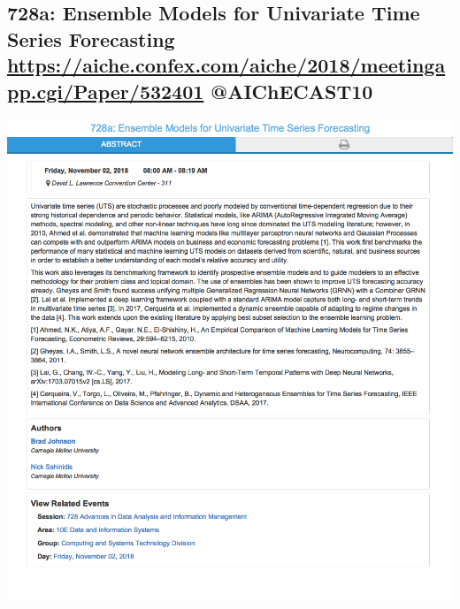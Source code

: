 \documentclass[11pt]{article}
\begin{document}
\subsection{728a: Ensemble Models for Univariate Time Series Forecasting \url{https://aiche.confex.com/aiche/2018/meetingapp.cgi/Paper/532401} @AIChECAST10}
\label{sec:org1e33a62}
\begin{center}
\includegraphics[width=.9\linewidth]{./532401.png}
\end{center}
\end{document}

